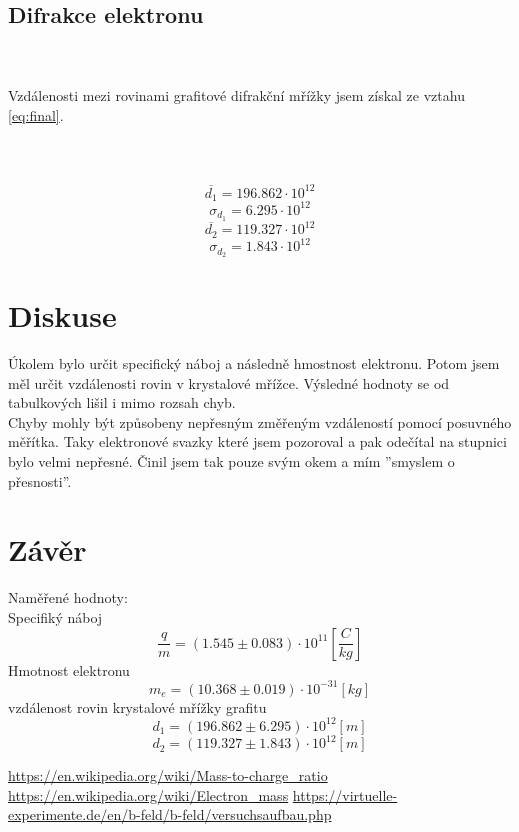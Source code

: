 \documentclass{article}
\begin{document}
\subsection{Difrakce elektronu}
\\
\vspace{1em}
\\
Vzdálenosti mezi rovinami grafitové difrakční mřížky jsem získal ze vztahu \ref{eq:final}.
\\
\vspace{1em}
\\
\\
\vspace{1em}
\\
$$\overline{d_1} = 196.862 \cdot 10^{12}$$
$$\sigma_{d_1} = 6.295 \cdot 10^{12}$$
$$\overline{d_2} = 119.327 \cdot 10^{12}$$
$$\sigma_{d_2} = 1.843 \cdot 10^{12}$$
\section{Diskuse}
Úkolem bylo určit specifický náboj a následně hmostnost elektronu.
Potom jsem měl určit vzdálenosti rovin v krystalové mřížce.
Výsledné hodnoty se od tabulkových lišil i mimo rozsah chyb. \cite{r:qm} \cite{r:em} \\
Chyby mohly být způsobeny nepřesným změřeným vzdáleností pomocí posuvného měřítka.
Taky elektronové svazky které jsem pozoroval a pak odečítal na stupnici bylo velmi nepřesné.
Činil jsem tak pouze svým okem a mím ''smyslem o přesnosti''.
\section{Závěr}
Naměřené hodnoty:\\
Specifiký náboj
$$\frac{q}{m} = (1.545 \pm 0.083) \cdot 10^{11} \left[ \frac{C}{kg} \right]$$
Hmotnost elektronu
$$m_{e} = (10.368 \pm 0.019) \cdot 10^{-31} [kg]$$
vzdálenost rovin krystalové mřížky grafitu
$$d_{1} = (196.862 \pm 6.295) \cdot 10^{12} [m]$$
$$d_{2} = (119.327 \pm 1.843) \cdot 10^{12} [m]$$
\begin{thebibliography}{1}
  \url{https://en.wikipedia.org/wiki/Mass-to-charge_ratio}
  \url{https://en.wikipedia.org/wiki/Electron_mass}
  \url{https://virtuelle-experimente.de/en/b-feld/b-feld/versuchsaufbau.php}
\end{thebibliography}
\end{document}
